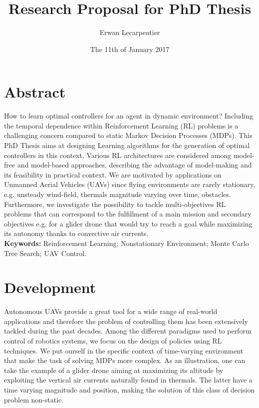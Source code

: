 \documentclass[a4paper]{article}
\begin{document}
\title{Research Proposal for PhD Thesis}
\author{Erwan Lecarpentier}
\date{The 11th of January 2017}

\maketitle


\section{Abstract}
How to learn optimal controllers for an agent in dynamic environment? Including the temporal dependence within Reinforcement Learning (RL) problems is a challenging concern compared to static Markov Decision Processes (MDPs). This PhD Thesis aims at designing Learning algorithms for the generation of optimal controllers in this context. Various RL architectures are considered among model-free and model-based approaches, describing the advantage of model-making and its feasibility in practical context.
We are motivated by applications on Unmanned Aerial Vehicles (UAVs) since flying environments are rarely stationary, e.g. unsteady wind-field, thermals magnitude varying over time, obstacles.
Furthermore, we investigate the possibility to tackle multi-objectives RL problems that can correspond to the fulfillment of a main mission and secondary objectives e.g. for a glider drone that would try to reach a goal while maximizing its autonomy thanks to convective air currents.\\

\noindent \textbf{Keywords:} Reinforcement Learning; Nonstationary Environment; Monte Carlo Tree Search; UAV Control.

\section{Development}
Autonomous UAVs provide a great tool for a wide range of real-world applications and therefore the problem of controlling them has been extensively tackled during the past decades.
Among the different paradigms used to perform control of robotics systems, we focus on the design of policies using RL techniques. We put ourself in the specific context of time-varying environment that make the task of solving MDPs more complex. As an illustration, one can take the example of a glider drone aiming at maximizing its altitude by exploiting the vertical air currents naturally found in thermals. The latter have a time varying magnitude and position, making the solution of this class of decision problem non-static.
\end{document}
